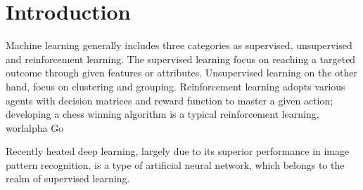 \section{Introduction}

Machine learning generally includes three categories as supervised, unsupervised and reinforcement learning. The supervised learning focus on reaching a targeted outcome through given features or attributes. Unsupervised learning on the other hand, focus on clustering and grouping. Reinforcement learning adopts various agents with decision matrices and reward function to master a given action; developing a chess winning algorithm is a typical reinforcement learning, worlalpha Go
\par
Recently heated deep learning, largely due to its superior performance in image pattern recognition, is a type of artificial neural network, which belongs to the realm of supervised learning. 
